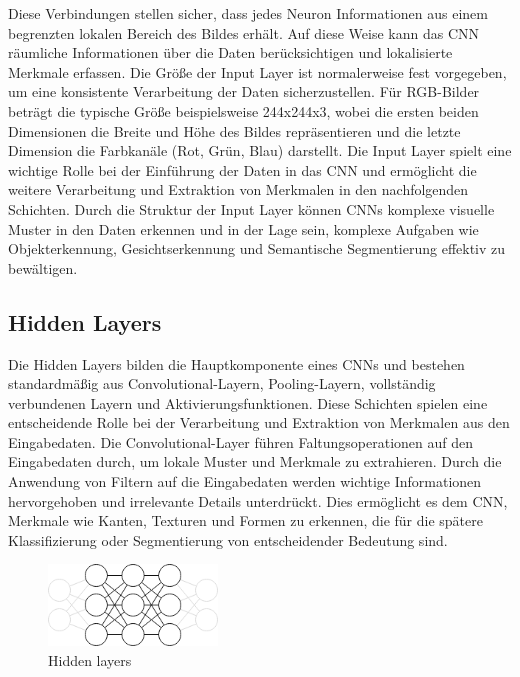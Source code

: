    Diese Verbindungen stellen sicher, dass jedes Neuron Informationen aus einem begrenzten lokalen Bereich des Bildes erhält. Auf diese Weise kann das \ac{CNN} räumliche Informationen über die Daten berücksichtigen und lokalisierte Merkmale erfassen.
    Die Größe der Input Layer ist normalerweise fest vorgegeben, um eine konsistente Verarbeitung der Daten sicherzustellen. 
    Für RGB-Bilder beträgt die typische Größe beispielsweise 244x244x3, wobei die ersten beiden Dimensionen die Breite und Höhe des Bildes repräsentieren und die letzte Dimension die Farbkanäle (Rot, Grün, Blau) darstellt.
    Die Input Layer spielt eine wichtige Rolle bei der Einführung der Daten in das \ac{CNN} und ermöglicht die weitere Verarbeitung und Extraktion von Merkmalen in den nachfolgenden Schichten. 
    Durch die Struktur der Input Layer können CNNs komplexe visuelle Muster in den Daten erkennen und in der Lage sein, komplexe Aufgaben wie Objekterkennung, Gesichtserkennung und Semantische Segmentierung effektiv zu bewältigen.

\subsection{Hidden Layers}
    Die Hidden Layers bilden die Hauptkomponente eines \acfp{CNN} und bestehen standardmäßig aus Convolutional-Layern, Pooling-Layern, vollständig verbundenen Layern und Aktivierungsfunktionen. 
    Diese Schichten spielen eine entscheidende Rolle bei der Verarbeitung und Extraktion von Merkmalen aus den Eingabedaten.
    Die Convolutional-Layer führen Faltungsoperationen auf den Eingabedaten durch, um lokale Muster und Merkmale zu extrahieren. Durch die Anwendung von Filtern auf die Eingabedaten werden wichtige Informationen hervorgehoben und irrelevante Details unterdrückt. 
    Dies ermöglicht es dem \ac{CNN}, Merkmale wie Kanten, Texturen und Formen zu erkennen, die für die spätere Klassifizierung oder Segmentierung von entscheidender Bedeutung sind.

    \begin{figure}[h]
        \centering
        \includegraphics[width=0.4\textwidth]{img/hidden_layers.png}
        \caption{Hidden layers}
        \label{fig:hidden_layers}
    \end{figure}
    
